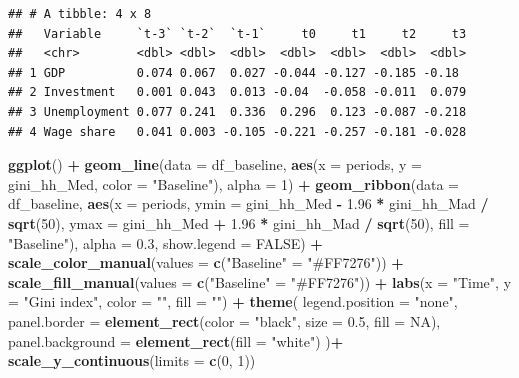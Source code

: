 \documentclass[
]{article}
\newenvironment{Shaded}{\begin{snugshade}}{\end{snugshade}}
\newcommand{\AttributeTok}[1]{\textcolor[rgb]{0.13,0.29,0.53}{#1}}
\newcommand{\ConstantTok}[1]{\textcolor[rgb]{0.56,0.35,0.01}{#1}}
\newcommand{\DecValTok}[1]{\textcolor[rgb]{0.00,0.00,0.81}{#1}}
\newcommand{\FloatTok}[1]{\textcolor[rgb]{0.00,0.00,0.81}{#1}}
\newcommand{\FunctionTok}[1]{\textcolor[rgb]{0.13,0.29,0.53}{\textbf{#1}}}
\newcommand{\NormalTok}[1]{#1}
\newcommand{\OtherTok}[1]{\textcolor[rgb]{0.56,0.35,0.01}{#1}}
\newcommand{\SpecialCharTok}[1]{\textcolor[rgb]{0.81,0.36,0.00}{\textbf{#1}}}
\newcommand{\StringTok}[1]{\textcolor[rgb]{0.31,0.60,0.02}{#1}}
\begin{document}
\begin{verbatim}
## # A tibble: 4 x 8
##   Variable     `t-3` `t-2`  `t-1`     t0     t1     t2     t3
##   <chr>        <dbl> <dbl>  <dbl>  <dbl>  <dbl>  <dbl>  <dbl>
## 1 GDP          0.074 0.067  0.027 -0.044 -0.127 -0.185 -0.18 
## 2 Investment   0.001 0.043  0.013 -0.04  -0.058 -0.011  0.079
## 3 Unemployment 0.077 0.241  0.336  0.296  0.123 -0.087 -0.218
## 4 Wage share   0.041 0.003 -0.105 -0.221 -0.257 -0.181 -0.028
\end{verbatim}

\begin{Shaded}
\begin{Highlighting}[]
\FunctionTok{ggplot}\NormalTok{() }\SpecialCharTok{+}
  \FunctionTok{geom\_line}\NormalTok{(}\AttributeTok{data =}\NormalTok{ df\_baseline, }\FunctionTok{aes}\NormalTok{(}\AttributeTok{x =}\NormalTok{ periods, }\AttributeTok{y =}\NormalTok{ gini\_hh\_Med, }\AttributeTok{color =} \StringTok{"Baseline"}\NormalTok{), }\AttributeTok{alpha =} \DecValTok{1}\NormalTok{) }\SpecialCharTok{+}
  \FunctionTok{geom\_ribbon}\NormalTok{(}\AttributeTok{data =}\NormalTok{ df\_baseline, }\FunctionTok{aes}\NormalTok{(}\AttributeTok{x =}\NormalTok{ periods, }\AttributeTok{ymin =}\NormalTok{ gini\_hh\_Med }\SpecialCharTok{{-}} \FloatTok{1.96} \SpecialCharTok{*}\NormalTok{ gini\_hh\_Mad }\SpecialCharTok{/} \FunctionTok{sqrt}\NormalTok{(}\DecValTok{50}\NormalTok{), }
                                      \AttributeTok{ymax =}\NormalTok{ gini\_hh\_Med }\SpecialCharTok{+} \FloatTok{1.96} \SpecialCharTok{*}\NormalTok{ gini\_hh\_Mad }\SpecialCharTok{/} \FunctionTok{sqrt}\NormalTok{(}\DecValTok{50}\NormalTok{), }\AttributeTok{fill =} \StringTok{"Baseline"}\NormalTok{), }
              \AttributeTok{alpha =} \FloatTok{0.3}\NormalTok{, }\AttributeTok{show.legend =} \ConstantTok{FALSE}\NormalTok{) }\SpecialCharTok{+}
  \FunctionTok{scale\_color\_manual}\NormalTok{(}\AttributeTok{values =} \FunctionTok{c}\NormalTok{(}\StringTok{"Baseline"} \OtherTok{=} \StringTok{"\#FF7276"}\NormalTok{)) }\SpecialCharTok{+}
  \FunctionTok{scale\_fill\_manual}\NormalTok{(}\AttributeTok{values =} \FunctionTok{c}\NormalTok{(}\StringTok{"Baseline"} \OtherTok{=} \StringTok{"\#FF7276"}\NormalTok{)) }\SpecialCharTok{+}
  \FunctionTok{labs}\NormalTok{(}\AttributeTok{x =} \StringTok{"Time"}\NormalTok{, }\AttributeTok{y =} \StringTok{"Gini index"}\NormalTok{, }\AttributeTok{color =} \StringTok{""}\NormalTok{, }\AttributeTok{fill =} \StringTok{""}\NormalTok{) }\SpecialCharTok{+}
  \FunctionTok{theme}\NormalTok{(}
    \AttributeTok{legend.position =} \StringTok{"none"}\NormalTok{,}
    \AttributeTok{panel.border =} \FunctionTok{element\_rect}\NormalTok{(}\AttributeTok{color =} \StringTok{"black"}\NormalTok{, }\AttributeTok{size =} \FloatTok{0.5}\NormalTok{, }\AttributeTok{fill =} \ConstantTok{NA}\NormalTok{),}
    \AttributeTok{panel.background =} \FunctionTok{element\_rect}\NormalTok{(}\AttributeTok{fill =} \StringTok{"white"}\NormalTok{)}
\NormalTok{  )}\SpecialCharTok{+}
  \FunctionTok{scale\_y\_continuous}\NormalTok{(}\AttributeTok{limits =} \FunctionTok{c}\NormalTok{(}\DecValTok{0}\NormalTok{, }\DecValTok{1}\NormalTok{))}
\end{Highlighting}
\end{Shaded}
\end{document}
